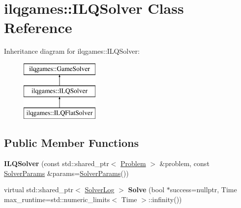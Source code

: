 \hypertarget{classilqgames_1_1_i_l_q_solver}{}\section{ilqgames\+:\+:I\+L\+Q\+Solver Class Reference}
\label{classilqgames_1_1_i_l_q_solver}
Inheritance diagram for ilqgames\+:\+:I\+L\+Q\+Solver\+:\begin{figure}[H]
\begin{center}
\leavevmode
\includegraphics[height=3.000000cm]{classilqgames_1_1_i_l_q_solver}
\end{center}
\end{figure}
\subsection*{Public Member Functions}
\begin{DoxyCompactItemize}
\item 
{\bfseries I\+L\+Q\+Solver} (const std\+::shared\+\_\+ptr$<$ \hyperlink{classilqgames_1_1_problem}{Problem} $>$ \&problem, const \hyperlink{structilqgames_1_1_solver_params}{Solver\+Params} \&params=\hyperlink{structilqgames_1_1_solver_params}{Solver\+Params}())\hypertarget{classilqgames_1_1_i_l_q_solver_a873b090b6a55ce1c33f780942c51e464}{}\label{classilqgames_1_1_i_l_q_solver_a873b090b6a55ce1c33f780942c51e464}

\item 
virtual std\+::shared\+\_\+ptr$<$ \hyperlink{classilqgames_1_1_solver_log}{Solver\+Log} $>$ {\bfseries Solve} (bool $\ast$success=nullptr, Time max\+\_\+runtime=std\+::numeric\+\_\+limits$<$ Time $>$\+::infinity())\hypertarget{classilqgames_1_1_i_l_q_solver_ad86d47ce8a04ab5f8e8fcfbf3db6b02e}{}\label{classilqgames_1_1_i_l_q_solver_ad86d47ce8a04ab5f8e8fcfbf3db6b02e}

\end{DoxyCompactItemize}
